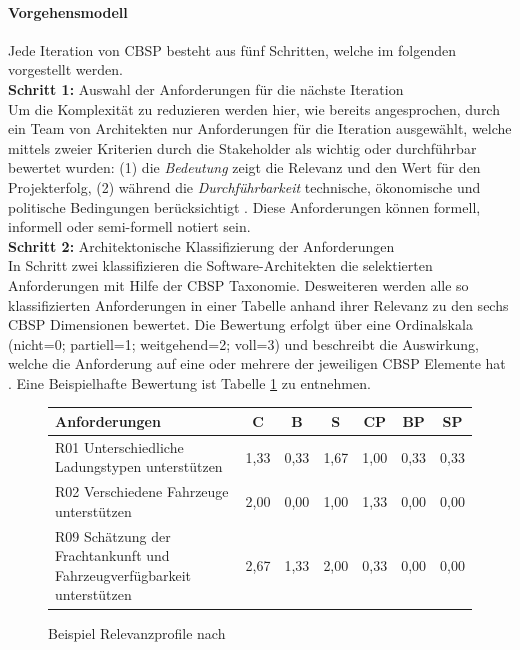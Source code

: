 \paragraph{Vorgehensmodell} 
Jede Iteration von CBSP besteht aus fünf Schritten, welche im folgenden vorgestellt werden. \\

\textbf{Schritt 1:} Auswahl der Anforderungen für die nächste Iteration \\
Um die Komplexität zu reduzieren werden hier, wie bereits angesprochen, durch ein Team von Architekten nur Anforderungen für die Iteration ausgewählt, welche mittels zweier Kriterien durch die Stakeholder als wichtig oder durchführbar bewertet wurden: (1) die \textit{Bedeutung} zeigt die Relevanz und den Wert für den Projekterfolg, (2) während die \textit{Durchführbarkeit} technische, ökonomische und politische Bedingungen berücksichtigt \cite{Gru01}. Diese Anforderungen können formell, informell oder semi-formell notiert sein. \\

\textbf{Schritt 2:} Architektonische Klassifizierung der Anforderungen \\
In Schritt zwei klassifizieren die Software-Architekten die selektierten Anforderungen mit Hilfe der CBSP Taxonomie. Desweiteren werden alle so klassifizierten Anforderungen in einer Tabelle anhand ihrer Relevanz zu den sechs CBSP Dimensionen bewertet. Die Bewertung erfolgt über eine Ordinalskala (nicht=0; partiell=1; weitgehend=2; voll=3) und beschreibt die Auswirkung, welche die Anforderung auf eine oder mehrere der jeweiligen CBSP Elemente hat \cite{Gru01}. Eine Beispielhafte Bewertung ist Tabelle \ref{tab:relevance_profiles} zu entnehmen. 

\begin{figure}[h] %
\caption{Beispiel Relevanzprofile nach \cite{Gru01}}
\centering
\begin{tabular}{|p{2.5cm}|c|c|c|c|c|c|}
\hline 
\rule[-1ex]{0pt}{2.5ex} \textbf{Anforderungen} & \textbf{C} & \textbf{B} & \textbf{S} & \textbf{CP} & \textbf{BP} & \textbf{SP} \\ 
\hline 
\rule[-1ex]{0pt}{2.5ex} R01 Unterschiedliche Ladungstypen unterstützen & 1,33 & 0,33 & \cellcolor{Gray} 1,67 & 1,00 & 0,33 & 0,33 \\ 
\hline 
\rule[-1ex]{0pt}{2.5ex} R02 Verschiedene Fahrzeuge unterstützen & \cellcolor{Gray} 2,00 & 0,00 & 1,00 & 1,33 & 0,00 & 0,00 \\ 
\hline 
\rule[-1ex]{0pt}{2.5ex} R09 Schätzung der Frachtankunft und Fahrzeugverfügbarkeit unterstützen & \cellcolor{Gray} 2,67 & 1,33 & 2,00 & 0,33 & 0,00 & 0,00 \\ 
\hline 
\end{tabular} 
\label{tab:relevance_profiles}
\end{figure}

